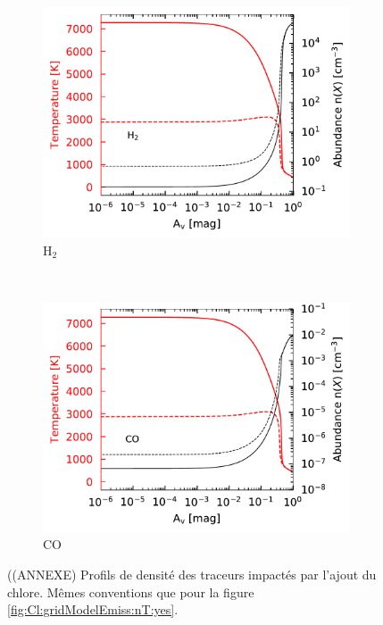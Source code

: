 \begin{figure}[!htbp]
    \begin{subfigure}[t]{0.49\textwidth} %
        \centering \includegraphics[trim = {0 0 0 0},clip,width=1\textwidth]{figure/Cl/gridModelEmiss/nT_comp_H2.pdf}
        \caption{$\mathrm{H}_2$}
    \end{subfigure}
    ~ 
    \begin{subfigure}[t]{0.49\textwidth} %
        \centering \includegraphics[trim = {0 0 0 0},clip,width=1\textwidth]{figure/Cl/gridModelEmiss/nT_comp_CO.pdf}
        \caption{$\mathrm{CO}$}
    \end{subfigure}
    
    \caption{((ANNEXE) Profils de densité des traceurs impactés par l'ajout du chlore. Mêmes conventions que pour la figure \ref{fig:Cl:gridModelEmiss:nT:yes}.}
    \label{fig:Cl:gridModelEmiss:nT:no}
\end{figure}

